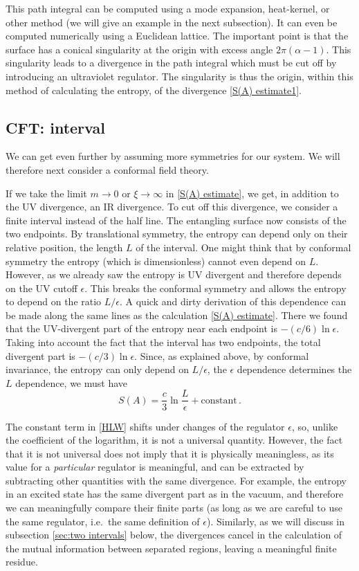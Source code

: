 \documentclass[11pt]{article}
\begin{document}
This path integral can be computed using a mode expansion, heat-kernel, or other method (we will give an example in the next subsection). It can even be computed numerically using a Euclidean lattice. The important point is that the surface has a conical singularity at the origin with excess angle $2\pi(\alpha-1)$. This singularity leads to a divergence in the path integral which must be cut off by introducing an ultraviolet regulator. The singularity is thus the origin, within this method of calculating the entropy, of the divergence \eqref{S(A) estimate1}.



\subsection{CFT: interval}
\label{sec:one interval}

We can get even further by assuming more symmetries for our system. We will therefore next consider a conformal field theory.

If we take the limit $m\to0$ or $\xi\to\infty$ in \eqref{S(A) estimate}, we get, in addition to the UV divergence, an IR divergence. To cut off this divergence, we consider a finite interval instead of the half line. The entangling surface now consists of the two endpoints. By translational symmetry, the entropy can depend only on their relative position, the length $L$ of the interval. One might think that by conformal symmetry the entropy (which is dimensionless) cannot even depend on $L$. However, as we already saw the entropy is UV divergent and therefore depends on the UV cutoff $\epsilon$. This breaks the conformal symmetry and allows the entropy to depend on the ratio $L/\epsilon$. A quick and dirty derivation of this dependence can be made along the same lines as the calculation \eqref{S(A) estimate}. There we found that the UV-divergent part of the entropy near each endpoint is $-(c/6)\ln\epsilon$. Taking into account the fact that the interval has two endpoints, the total divergent part is $-(c/3)\ln\epsilon$. Since, as explained above, by conformal invariance, the entropy can only depend on $L/\epsilon$, the $\epsilon$ dependence determines the $L$ dependence, we must have
\begin{equation}\label{HLW}
S(A) = \frac c3\ln\frac L\epsilon+\text{constant}\,.
\end{equation}

The constant term in \eqref{HLW} shifts under changes of the regulator $\epsilon$, so, unlike the coefficient of the logarithm, it is not a universal quantity. However, the fact that it is not universal does not imply that it is physically meaningless, as its value for a \emph{particular} regulator is meaningful, and can be extracted by subtracting other quantities with the same divergence. For example, the entropy in an excited state has the same divergent part as in the vacuum, and therefore we can meaningfully compare their finite parts (as long as we are careful to use the same regulator, i.e.\ the same definition of $\epsilon$). Similarly, as we will discuss in subsection \ref{sec:two intervals} below, the divergences cancel in the calculation of the mutual information between separated regions, leaving a meaningful finite residue.
\end{document}

